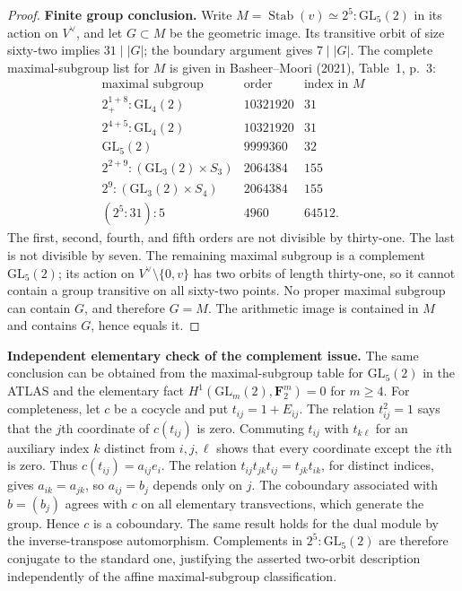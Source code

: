 \begin{proof}
\par\smallskip\noindent\textbf{Finite group conclusion.}
Write $M=\operatorname{Stab}(v)\simeq2^5\!:\!\mathrm{GL}_5(2)$
in its action on $V^\vee$, and let $G\subset M$ be the geometric image.
Its transitive orbit of size sixty-two implies $31\mid|G|$; the
boundary argument gives $7\mid|G|$.
The complete maximal-subgroup list for $M$ is given in
Basheer--Moori (2021), Table~1, p.~3:
\[
\begin{array}{c|r|r}
\text{maximal subgroup}&\text{order}&\text{index in }M\\\hline
2_+^{1+8}:\mathrm{GL}_4(2)&10321920&31\\
2^{4+5}:\mathrm{GL}_4(2)&10321920&31\\
\mathrm{GL}_5(2)&9999360&32\\
2^{2+9}:(\mathrm{GL}_3(2)\times S_3)&2064384&155\\
2^9:(\mathrm{GL}_3(2)\times S_4)&2064384&155\\
(2^5:31):5&4960&64512.
\end{array}
\]
The first, second, fourth, and fifth orders are not divisible by
thirty-one.  The last is not divisible by seven.  The remaining
maximal subgroup is a complement $\mathrm{GL}_5(2)$; its action on
$V^\vee\setminus\{0,v\}$ has two orbits of length thirty-one, so it
cannot contain a group transitive on all sixty-two points.
No proper maximal subgroup can contain $G$, and therefore $G=M$.
The arithmetic image is contained in $M$ and contains $G$, hence
equals it.
\end{proof}

\par\smallskip\noindent\textbf{Independent elementary check of the complement issue.}
The same conclusion can be obtained from the maximal-subgroup table
for $\mathrm{GL}_5(2)$ in the ATLAS and the elementary fact
$H^1(\mathrm{GL}_m(2),\mathbf F_2^m)=0$ for $m\geq4$.
For completeness, let $c$ be a cocycle and put
$t_{ij}=1+E_{ij}$.  The relation $t_{ij}^2=1$ says that the $j$th
coordinate of $c(t_{ij})$ is zero.  Commuting $t_{ij}$ with
$t_{k\ell}$ for an auxiliary index $k$ distinct from $i,j,\ell$
shows that every coordinate except the $i$th is zero.
Thus $c(t_{ij})=a_{ij}e_i$.  The relation
$t_{ij}t_{jk}t_{ij}=t_{jk}t_{ik}$, for distinct indices,
gives $a_{ik}=a_{jk}$, so $a_{ij}=b_j$ depends only on $j$.
The coboundary associated with $b=(b_j)$ agrees with $c$ on all
elementary transvections, which generate the group.  Hence $c$ is
a coboundary.  The same result holds for the dual module by the
inverse-transpose automorphism.  Complements in $2^5:\mathrm{GL}_5(2)$
are therefore conjugate to the standard one, justifying the asserted
two-orbit description independently of the affine maximal-subgroup
classification.

